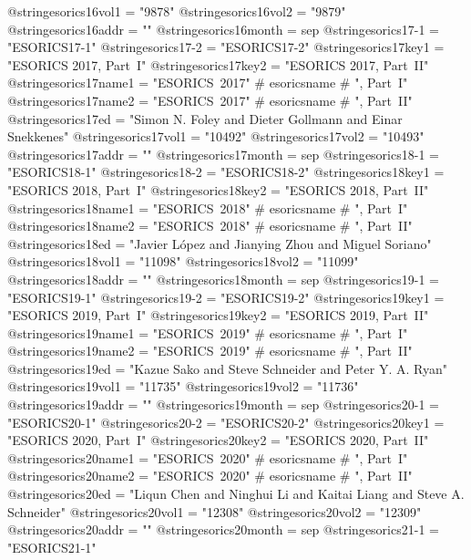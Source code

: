@string{esorics16vol1 =         "9878"}
@string{esorics16vol2 =         "9879"}
@string{esorics16addr =         ""}
@string{esorics16month =        sep}
@string{esorics17-1 =           "ESORICS17-1"}
@string{esorics17-2 =           "ESORICS17-2"}
@string{esorics17key1 =         "ESORICS 2017, Part~I"}
@string{esorics17key2 =         "ESORICS 2017, Part~II"}
@string{esorics17name1 =        "ESORICS~2017" # esoricsname # ", Part~I"}
@string{esorics17name2 =        "ESORICS~2017" # esoricsname # ", Part~II"}
@string{esorics17ed =           "Simon N. Foley and Dieter Gollmann and Einar Snekkenes"}
@string{esorics17vol1 =         "10492"}
@string{esorics17vol2 =         "10493"}
@string{esorics17addr =         ""}
@string{esorics17month =        sep}
@string{esorics18-1 =           "ESORICS18-1"}
@string{esorics18-2 =           "ESORICS18-2"}
@string{esorics18key1 =         "ESORICS 2018, Part~I"}
@string{esorics18key2 =         "ESORICS 2018, Part~II"}
@string{esorics18name1 =        "ESORICS~2018" # esoricsname # ", Part~I"}
@string{esorics18name2 =        "ESORICS~2018" # esoricsname # ", Part~II"}
@string{esorics18ed =           "Javier L{\'o}pez and Jianying Zhou and Miguel Soriano"}
@string{esorics18vol1 =         "11098"}
@string{esorics18vol2 =         "11099"}
@string{esorics18addr =         ""}
@string{esorics18month =        sep}
@string{esorics19-1 =           "ESORICS19-1"}
@string{esorics19-2 =           "ESORICS19-2"}
@string{esorics19key1 =         "ESORICS 2019, Part~I"}
@string{esorics19key2 =         "ESORICS 2019, Part~II"}
@string{esorics19name1 =        "ESORICS~2019" # esoricsname # ", Part~I"}
@string{esorics19name2 =        "ESORICS~2019" # esoricsname # ", Part~II"}
@string{esorics19ed =           "Kazue Sako and Steve Schneider and Peter Y. A. Ryan"}
@string{esorics19vol1 =         "11735"}
@string{esorics19vol2 =         "11736"}
@string{esorics19addr =         ""}
@string{esorics19month =        sep}
@string{esorics20-1 =           "ESORICS20-1"}
@string{esorics20-2 =           "ESORICS20-2"}
@string{esorics20key1 =         "ESORICS 2020, Part~I"}
@string{esorics20key2 =         "ESORICS 2020, Part~II"}
@string{esorics20name1 =        "ESORICS~2020" # esoricsname # ", Part~I"}
@string{esorics20name2 =        "ESORICS~2020" # esoricsname # ", Part~II"}
@string{esorics20ed =           "Liqun Chen and Ninghui Li and Kaitai Liang and Steve A. Schneider"}
@string{esorics20vol1 =         "12308"}
@string{esorics20vol2 =         "12309"}
@string{esorics20addr =         ""}
@string{esorics20month =        sep}
@string{esorics21-1 =           "ESORICS21-1"}
